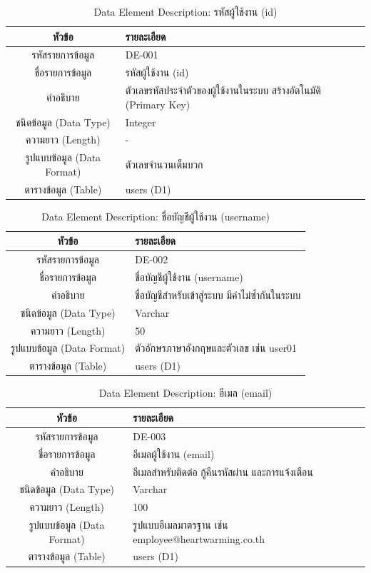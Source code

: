 \begin{table}[htbp]
\centering
\caption{Data Element Description: รหัสผู้ใช้งาน (id)}
\label{tab3:de_id}
\begin{tabularx}{\textwidth}{| c | L |}
\hline
\textbf{หัวข้อ} & \textbf{รายละเอียด} \\ \hline
รหัสรายการข้อมูล & DE-001 \\ \hline
ชื่อรายการข้อมูล & รหัสผู้ใช้งาน (id) \\ \hline
คำอธิบาย & ตัวเลขรหัสประจำตัวของผู้ใช้งานในระบบ สร้างอัตโนมัติ (Primary Key) \\ \hline
ชนิดข้อมูล (Data Type) & Integer \\ \hline
ความยาว (Length) & - \\ \hline
รูปแบบข้อมูล (Data Format) & ตัวเลขจำนวนเต็มบวก \\ \hline
ตารางข้อมูล (Table) & users (D1) \\ \hline
\end{tabularx}
\end{table}

\begin{table}[htbp]
\centering
\caption{Data Element Description: ชื่อบัญชีผู้ใช้งาน (username)}
\label{tab3:de_username}
\begin{tabularx}{\textwidth}{| c | L |}
\hline
\textbf{หัวข้อ} & \textbf{รายละเอียด} \\ \hline
รหัสรายการข้อมูล & DE-002 \\ \hline
ชื่อรายการข้อมูล & ชื่อบัญชีผู้ใช้งาน (username) \\ \hline
คำอธิบาย & ชื่อบัญชีสำหรับเข้าสู่ระบบ มีค่าไม่ซ้ำกันในระบบ \\ \hline
ชนิดข้อมูล (Data Type) & Varchar \\ \hline
ความยาว (Length) & 50 \\ \hline
รูปแบบข้อมูล (Data Format) & ตัวอักษรภาษาอังกฤษและตัวเลข เช่น user01 \\ \hline
ตารางข้อมูล (Table) & users (D1) \\ \hline
\end{tabularx}
\end{table}

\begin{table}[htbp]
\centering
\caption{Data Element Description: อีเมล (email)}
\label{tab3:de_email}
\begin{tabularx}{\textwidth}{| c | L |}
\hline
\textbf{หัวข้อ} & \textbf{รายละเอียด} \\ \hline
รหัสรายการข้อมูล & DE-003 \\ \hline
ชื่อรายการข้อมูล & อีเมลผู้ใช้งาน (email) \\ \hline
คำอธิบาย & อีเมลสำหรับติดต่อ กู้คืนรหัสผ่าน และการแจ้งเตือน \\ \hline
ชนิดข้อมูล (Data Type) & Varchar \\ \hline
ความยาว (Length) & 100 \\ \hline
รูปแบบข้อมูล (Data Format) & รูปแบบอีเมลมาตรฐาน เช่น employee@heartwarming.co.th \\ \hline
ตารางข้อมูล (Table) & users (D1) \\ \hline
\end{tabularx}
\end{table}

